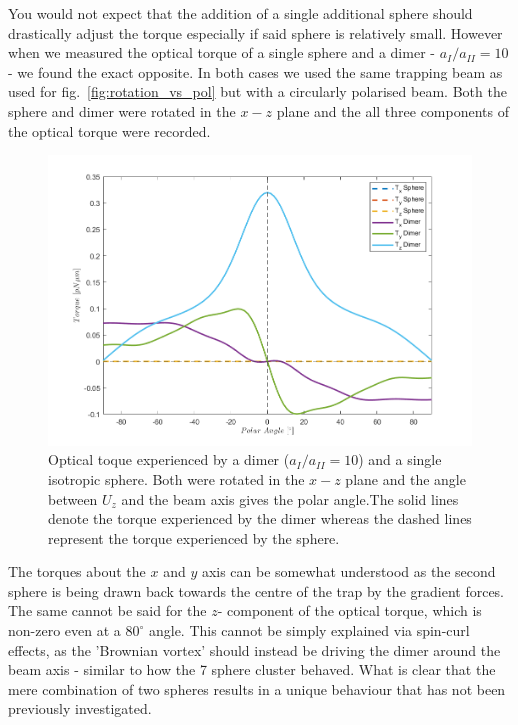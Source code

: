 You would not expect that the addition of a single additional 
sphere should drastically adjust the torque especially if said 
sphere is relatively small. However when we measured the optical 
torque of a single sphere and a dimer - $a_{I}/a_{II}=10$ - we 
found the exact opposite. In both cases we used the same trapping 
beam as used for fig.~\ref{fig:rotation_vs_pol} but with a 
circularly polarised beam. Both the sphere and dimer were rotated 
in the $x-z$ plane and the all three components of the optical 
torque were recorded.
\begin{figure}[h!]
	\centering	
	\includegraphics[width=\linewidth]{sphere_dimer_torque.png}
	\caption{Optical toque experienced by a dimer ($a_{I}/a_
	{II}=10$) and a single isotropic sphere. Both were rotated 
	in the $x-z$ plane and the angle between $U_z$ and the beam 
	axis gives the polar angle.The solid lines denote the torque 
	experienced by the dimer whereas the dashed lines represent 
	the torque experienced by the sphere.}
	\label{fig:sphere_dimer_torque}
\end{figure}
 
The torques about the $x$ and $y$ axis can be somewhat understood 
as the second sphere is being drawn back towards the centre of the 
trap by the gradient forces. The same cannot be said for the $z$-
component of the optical torque, which is non-zero even at a 
$80^\circ$ angle. This cannot be simply explained via spin-curl 
effects, as the 'Brownian vortex' should instead be driving the
dimer around the beam axis - similar to how the 7 sphere cluster 
behaved. What is clear that the mere combination of two spheres
results in a unique behaviour that has not been previously 
investigated. 

